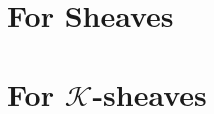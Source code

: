 \section{For Sheaves}

\begin{definition}\label{def:pushforward_of_sheaf}

\end{definition}

\begin{definition}\label{def:pullback_of_sheaf}

\end{definition}

\begin{definition}\label{def:exceptional_pushforward_of_sheaf}

\end{definition}

\section{For $\mathcal{K}$-sheaves}

\begin{definition}\label{def:pushforward_of_K-sheaf}

\end{definition}

\begin{definition}\label{def:pullback_of_K-sheaf}

\end{definition}

\begin{definition}\label{def:exceptional_pushforward_of_K-sheaf}

\end{definition}